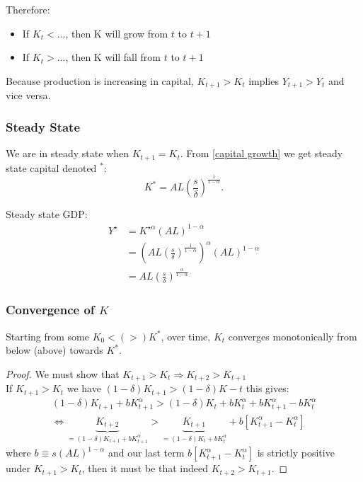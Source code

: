 \documentclass[11pt]{article}
\begin{document}
Therefore:
\begin{itemize}
    \item If $K_t < ...$, then K will grow from $t$ to $t+1$ 
    \item If $K_t > ...$, then K will fall from $t$ to $t+1$
\end{itemize}

\begin{note}
    Because production is increasing in capital, $K_{t+1}>K_t$ implies $Y_{t+1} > Y_t$ and vice versa.
\end{note}

\subsubsection{Steady State}
We are in steady state when $K_{t+1} = K_t$. From \eqref{capital growth} we get steady state capital denoted $^*$:
\begin{equation}
    \label{steady state}
    K^* = AL\left( \dfrac{s}{\delta}\right)^{\frac{1}{1-\alpha}}.
\end{equation}

Steady state GDP:
\begin{equation}
\label{steady state gdp}
\begin{aligned}
Y^{\star} & =K^{\star \alpha}(A L)^{1-\alpha} \\
& =\left(A L\left(\frac{s}{\delta}\right)^{\frac{1}{1-\alpha}}\right)^\alpha(A L)^{1-\alpha} \\
& =A L\left(\frac{s}{\delta}\right)^{\frac{\alpha}{1-\alpha}}
\end{aligned}
\end{equation}

\subsubsection{Convergence of $K$}

Starting from some $K_0<(>)K^*$, over time, $K_t$ converges monotonically from below (above) towards $K^*$.

\begin{proof}
We must show that $K_{t+1}>K_t \Rightarrow K_{t+2}>K_{t+1}$\\
If $K_{t+1}>K_t$ we have $(1-\delta)K_{t+1} > (1-\delta)K-t$ this gives:
\begin{gather*}
    (1-\delta)K_{t+1} + bK_{t+1}^\alpha > (1-\delta)K_{t} + bK_t^\alpha + bK_{t+1}^\alpha - bK_t^\alpha \\
    \Leftrightarrow \underbrace{K_{t+2}}_{=(1-\delta)K_{t+1} + bK_{t+1}^\alpha} > \underbrace{K_{t+1}}_{=(1-\delta)K_{t} + bK_t^\alpha} + b[K_{t+1}^\alpha - K_t^\alpha]
\end{gather*}
where $b \equiv s(AL)^{1-\alpha}$ and our last term $b[K_{t+1}^\alpha - K_t^\alpha]$ is strictly positive under $K_{t+1}>K_t$, then it must be that indeed $K_{t+2}>K_{t+1}.$
\end{proof}
\end{document}
